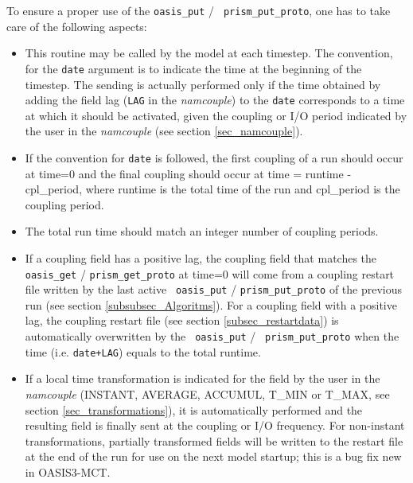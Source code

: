 To ensure a proper use of the {\tt oasis\_put} / {\tt
  prism\_put\_proto}, one has to take care of the following aspects:

\begin{itemize}

\item This routine may be called by the model at each timestep. The
  convention, for the {\tt date} argument is to indicate the time at
  the beginning of the timestep. The sending is actually performed
  only if the time obtained by adding the field lag ({\tt LAG} in the
  {\em namcouple}) to the {\tt date} corresponds to a time at which it
  should be activated, given the coupling or I/O period indicated by
  the user in the {\it namcouple} (see section \ref{sec_namcouple}). 
\item If the convention for {\tt date} is followed, the first
  coupling of a run should occur at time=0 and the final coupling
  should occur at time = runtime - cpl\_period, where runtime is the
  total time of the run and cpl\_period is the coupling period. 
\item The total run time should match an integer number of coupling
  periods.
\item If a coupling field has a positive lag, the coupling field that
  matches the {\tt oasis\_get} / {\tt prism\_get\_proto} at time=0
  will come from a coupling restart file written by the last active {\tt
  oasis\_put} / {\tt prism\_put\_proto} of the previous run (see
  section \ref{subsubsec_Algoritms}). For a coupling field with a
  positive lag, the coupling restart file (see section
  \ref{subsec_restartdata}) is automatically overwritten by the {\tt
  oasis\_put} / {\tt
    prism\_put\_proto} when the time (i.e. {\tt date+LAG}) equals
  to the total runtime.
\item If a local time transformation is indicated for the field by the
  user in the {\it namcouple} (INSTANT, AVERAGE, ACCUMUL, T\_MIN or
  T\_MAX, see section \ref{sec_transformations}), it is automatically
  performed and the resulting field is finally sent at the coupling or
  I/O frequency.  For non-instant transformations, partially
  transformed fields will be written to the restart file at the end of
  the run for use on the next model startup; this is a bug fix new in
  OASIS3-MCT.
\end{itemize}

